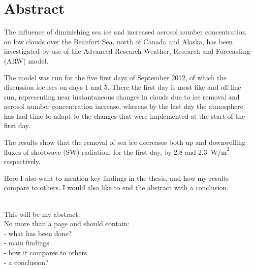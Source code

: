 \chapter*{Abstract}
The influence of diminishing sea ice and increased aerosol number concentration on low clouds over the Beaufort Sea, north of Canada and Alaska, has been investigated by use of the Advanced Research Weather, Research and Forecasting (ARW) model.

The model was run for the five first days of September 2012, of which the discussion focuses on days 1 and 5. There the first day is most like and off line run, representing near instantaneous changes in clouds due to ice removal and aerosol number concentration increase, whereas by the last day the atmosphere has had time to adapt to the changes that were implemented at the start of the first day.

The results show that the removal of sea ice decreases both up and downwelling fluxes of shortwave (SW) radiation, for the first day, by 2.8 and 2.3~$\text{W/m}^2$ respectively. 

Here I also want to mention key findings in the thesis, and how my results compare to others. I would also like to end the abstract with a conclusion.


\text{  }\\This will be my abstract. \\
No more than a page and should contain:\\
- what has been done?\\
- main findings\\
- how it compares to others\\
- a conclusion?